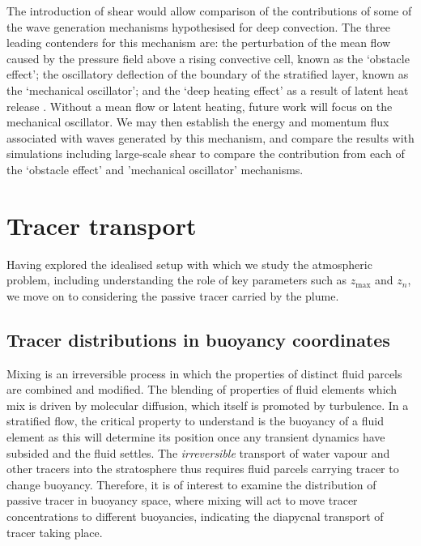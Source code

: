\documentclass[a4paper]{article}
\begin{document}
The introduction of shear would allow comparison of the contributions of some of the 
wave generation mechanisms hypothesised for deep convection. The three leading contenders for this 
mechanism are: the perturbation of the mean flow caused by the pressure field above a rising convective cell,
known as the `obstacle effect'; the oscillatory deflection of the boundary of the stratified layer, known as
the `mechanical oscillator'; and the `deep heating effect' as a result of latent heat release
\citep{flynn2004}. Without a mean flow or latent heating, future work will focus on the mechanical oscillator.
We may then establish the energy and momentum flux associated with waves generated by this mechanism, and
compare the results with simulations including large-scale shear to compare the contribution from each of the
`obstacle effect' and 'mechanical oscillator' mechanisms.


\section{Tracer transport}
\label{sec:tracertransport}
Having explored the idealised setup with which we study the atmospheric problem, including understanding the
role of key parameters such as $z_{\max}$ and $z_n$, we move on to considering the passive tracer carried by
the plume. 

\subsection{Tracer distributions in buoyancy coordinates}
\label{sec:distributions}

Mixing is an irreversible process in which the properties of distinct fluid parcels are combined and modified.
The blending of properties of fluid elements which mix is driven by molecular diffusion, which itself
is promoted by turbulence. In a stratified flow, the critical property to understand is the buoyancy of a
fluid element as this will determine its position once any transient dynamics have subsided and the fluid
settles. The \emph{irreversible} transport of water vapour and other tracers into the stratosphere thus
requires fluid parcels carrying tracer to change buoyancy. Therefore, it is of interest to examine the
distribution of passive tracer in buoyancy space, where mixing will act to move tracer concentrations to
different buoyancies, indicating the diapycnal transport of tracer taking place. 
\end{document}
